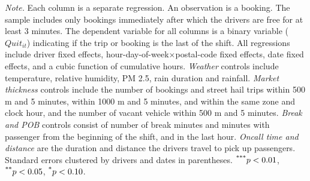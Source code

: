 \documentclass[reviewmode]{restat}
\begin{document}
\begin{table}[]
{\begin{tabular}{l*{5}{S[table-format = 0.4, table-space-text-pre={**}, table-space-text-post={-**}]}}
    \end{tabular}
    }
	\begin{tablenotes}
	\small
        \textit{Note.} Each column is a separate regression. An observation is a booking. The sample includes only bookings immediately after which the drivers are free for at least 3 minutes. The dependent variable for all columns is a binary variable ($Quit_{it}$) indicating if the trip or booking is the last of the shift. All regressions include driver fixed effects, hour-day-of-week\(\times\)postal-code fixed effects, date fixed effects, and a cubic function of cumulative hours. \textit{Weather} controls include temperature, relative humidity, PM 2.5, rain duration and rainfall. \textit{Market thickness }controls include the number of bookings and street hail trips within 500 m and 5 minutes, within 1000 m and 5 minutes, and within the same zone and clock hour, and the number of vacant vehicle within 500 m and 5 minutes. \textit{Break and POB} controls consist of number of break minutes and minutes with passenger from the beginning of the shift, and in the last hour. \textit{Oncall time and distance} are the duration and distance the drivers travel to pick up passengers. Standard errors clustered by drivers and dates in parentheses. $\textsuperscript{***}p < 0.01$, $\textsuperscript{**}p < 0.05$, $\textsuperscript{*}p < 0.10$. 
	\end{tablenotes}
\end{table}
\end{document}
